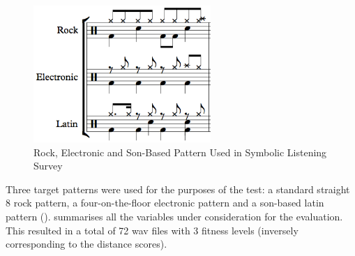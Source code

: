 \begin{figure}
	\begin{center}
		\includegraphics[width=0.6\textwidth]{ch03_symbolic/figures/patterns.png}
	\end{center}
	\caption[Rock, Electronic and Son-Based Pattern Used in Symbolic Listening Survey]{Rock, Electronic and Son-Based Pattern Used in Symbolic Listening Survey}
	\label{fig:symbolic_patterns}
\end{figure}

Three target patterns were used for the purposes of the test: a standard straight 8 rock pattern, a four-on-the-floor electronic pattern and a son-based latin pattern ().  summarises all the variables under consideration for the evaluation. This resulted in a total of 72 \acrfull{wav} files with 3 fitness levels (inversely corresponding to the distance scores).

